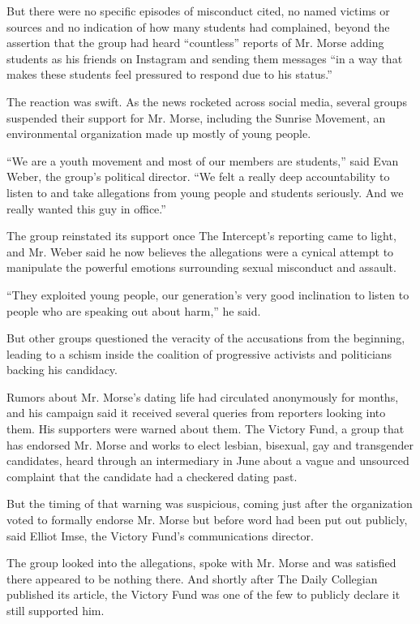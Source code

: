 But there were no specific episodes of misconduct cited, no named
victims or sources and no indication of how many students had
complained, beyond the assertion that the group had heard ``countless''
reports of Mr. Morse adding students as his friends on Instagram and
sending them messages ``in a way that makes these students feel
pressured to respond due to his status.''

The reaction was swift. As the news rocketed across social media,
several groups suspended their support for Mr. Morse, including the
Sunrise Movement, an environmental organization made up mostly of young
people.

``We are a youth movement and most of our members are students,'' said
Evan Weber, the group's political director. ``We felt a really deep
accountability to listen to and take allegations from young people and
students seriously. And we really wanted this guy in office.''

The group reinstated its support once The Intercept's reporting came to
light, and Mr. Weber said he now believes the allegations were a cynical
attempt to manipulate the powerful emotions surrounding sexual
misconduct and assault.

``They exploited young people, our generation's very good inclination to
listen to people who are speaking out about harm,'' he said.

But other groups questioned the veracity of the accusations from the
beginning, leading to a schism inside the coalition of progressive
activists and politicians backing his candidacy.

Rumors about Mr. Morse's dating life had circulated anonymously for
months, and his campaign said it received several queries from reporters
looking into them. His supporters were warned about them. The Victory
Fund, a group that has endorsed Mr. Morse and works to elect lesbian,
bisexual, gay and transgender candidates, heard through an intermediary
in June about a vague and unsourced complaint that the candidate had a
checkered dating past.

But the timing of that warning was suspicious, coming just after the
organization voted to formally endorse Mr. Morse but before word had
been put out publicly, said Elliot Imse, the Victory Fund's
communications director.

The group looked into the allegations, spoke with Mr. Morse and was
satisfied there appeared to be nothing there. And shortly after The
Daily Collegian published its article, the Victory Fund was one of the
few to publicly declare it still supported him.

